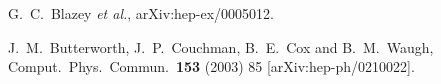 \begin{thebibliography}

  G.~C.~Blazey {\it et al.},
  arXiv:hep-ex/0005012.

  J.~M.~Butterworth, J.~P.~Couchman, B.~E.~Cox and B.~M.~Waugh,
  Comput.\ Phys.\ Commun.\  {\bf 153} (2003) 85
  [arXiv:hep-ph/0210022].

\end{thebibliography}